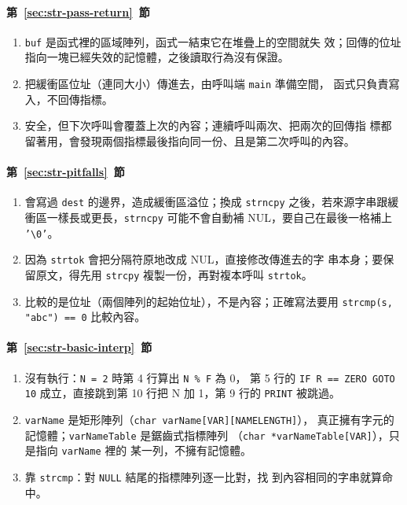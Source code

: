 \paragraph{第~\ref{sec:str-pass-return}~節}
\begin{enumerate}
\item \texttt{buf} 是函式裡的區域陣列，函式一結束它在堆疊上的空間就失
效；回傳的位址指向一塊已經失效的記憶體，之後讀取行為沒有保證。
\item 把緩衝區位址（連同大小）傳進去，由呼叫端 \texttt{main} 準備空間，
函式只負責寫入，不回傳指標。
\item 安全，但下次呼叫會覆蓋上次的內容；連續呼叫兩次、把兩次的回傳指
標都留著用，會發現兩個指標最後指向同一份、且是第二次呼叫的內容。
\end{enumerate}

\paragraph{第~\ref{sec:str-pitfalls}~節}
\begin{enumerate}
\item 會寫過 \texttt{dest} 的邊界，造成緩衝區溢位；換成 \texttt{strncpy}
之後，若來源字串跟緩衝區一樣長或更長，\texttt{strncpy} 可能不會自動補
NUL，要自己在最後一格補上 \texttt{'\textbackslash 0'}。
\item 因為 \texttt{strtok} 會把分隔符原地改成 NUL，直接修改傳進去的字
串本身；要保留原文，得先用 \texttt{strcpy} 複製一份，再對複本呼叫
\texttt{strtok}。
\item 比較的是位址（兩個陣列的起始位址），不是內容；正確寫法要用
\texttt{strcmp(s, "abc") == 0} 比較內容。
\end{enumerate}

\paragraph{第~\ref{sec:str-basic-interp}~節}
\begin{enumerate}
\item 沒有執行：\texttt{N = 2} 時第 4 行算出 \texttt{N \% F} 為 $0$，
第 5 行的 \texttt{IF R == ZERO GOTO 10} 成立，直接跳到第 10 行把 N 加
1，第 9 行的 \texttt{PRINT} 被跳過。
\item \texttt{varName} 是矩形陣列（\texttt{char varName[VAR][NAMELENGTH]}），
真正擁有字元的記憶體；\texttt{varNameTable} 是鋸齒式指標陣列
（\texttt{char *varNameTable[VAR]}），只是指向 \texttt{varName} 裡的
某一列，不擁有記憶體。
\item 靠 \texttt{strcmp}：對 \texttt{NULL} 結尾的指標陣列逐一比對，找
到內容相同的字串就算命中。
\end{enumerate}
